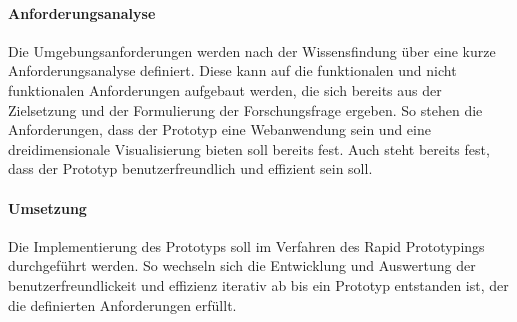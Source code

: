\paragraph{Anforderungsanalyse}
Die Umgebungsanforderungen werden nach der Wissensfindung über eine kurze Anforderungsanalyse definiert. Diese kann auf die funktionalen und nicht funktionalen Anforderungen aufgebaut werden, die sich bereits aus der Zielsetzung und der Formulierung der Forschungsfrage ergeben. So stehen die Anforderungen, dass der Prototyp eine Webanwendung sein und eine dreidimensionale Visualisierung bieten soll bereits fest. Auch steht bereits fest, dass der Prototyp benutzerfreundlich und effizient sein soll.

\paragraph{Umsetzung}
Die Implementierung des Prototyps soll im Verfahren des Rapid Prototypings durchgeführt werden. So wechseln sich die Entwicklung und Auswertung der benutzerfreundlickeit und effizienz iterativ ab bis ein Prototyp entstanden ist, der die definierten Anforderungen erfüllt.
